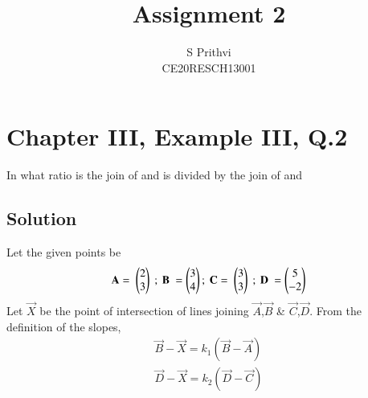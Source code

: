 \documentclass[journal,12pt,twocolumn]{IEEEtran}
\begin{document}
\def\putbox#1#2#3{\makebox[0in][l]{\makebox[#1][l]{}\raisebox{\baselineskip}[0in][0in]{\raisebox{#2}[0in][0in]{#3}}}}
     \def\rightbox#1{\makebox[0in][r]{#1}}
     \def\centbox#1{\makebox[0in]{#1}}
     \def\topbox#1{\raisebox{-\baselineskip}[0in][0in]{#1}}
     \def\midbox#1{\raisebox{-0.5\baselineskip}[0in][0in]{#1}}
\vspace{3cm}
\title{Assignment 2}
\author{S Prithvi \\ CE20RESCH13001}
\maketitle
\newpage
\bigskip
\renewcommand{\thefigure}{\theenumi}
\renewcommand{\thetable}{\theenumi}
\section{Chapter III, Example III, Q.2}
In what ratio is the join of  and  is divided by the join of  and 
\subsection{Solution}
Let the given points be
\begin{equation}
\vec{A} = \ \myvec{2 \\3} \ ; \ \vec{B} \ = \myvec{3\\ 4}; \ 
\vec{C} = \ \myvec{3 \\3} \ ; \ \vec{D} \ = \myvec{5\\ -2} \label{1}
\end{equation}
Let $\vec{X}$ be the point of intersection of lines joining $\vec{A}$,$\vec{B}$ \& $\vec{C}$,$\vec{D}$. From the definition of the slopes,
\begin{align}
\vec{B} - \vec{X} = k_{1}(\vec{B}-\vec{A})\label{2}\\
\vec{D} - \vec{X} = k_2(\vec{D} - \vec{C}) \label{3}    
\end{align}
\end{document}
